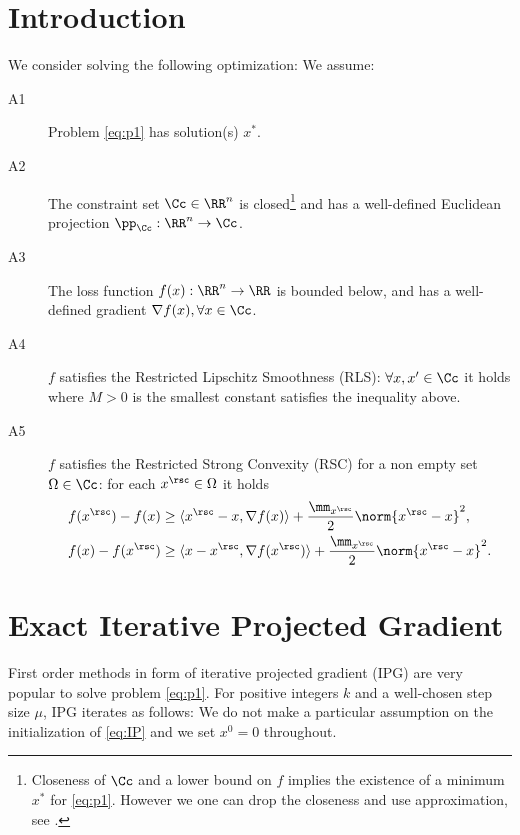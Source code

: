\section{Introduction}
We consider solving the following optimization:
We assume:
\begin{description}
\item [A1] Problem \eqref{eq:p1} has solution(s) $x^*$.	
\item [A2]The constraint set $\Cc\in \RR^n$ is closed\footnote{Closeness of $\Cc$ and a lower bound on $f$ implies the existence of a minimum $x^*$ for \eqref{eq:p1}. However we one can drop the closeness and use approximation, see \cite{Blumen}.} and has a well-defined Euclidean projection $\pp_\Cc:\RR^n\rightarrow \Cc$. %
\item [A3] The loss function $f(x):\RR^n\rightarrow \RR$ is bounded below, and has a well-defined gradient $\nabla f(x), \forall x\in \Cc$.
\item [A4] $f$ satisfies the Restricted Lipschitz Smoothness (RLS): $\forall x,x'\in \Cc$ it holds 
where $M>0$ is the smallest constant satisfies the inequality above.
\item [A5]  $f$ satisfies the Restricted Strong Convexity (RSC) for a non empty set $\Omega\in \Cc$: for each $x^\rsc\in\Omega$ it holds
\begin{align*} 
f(x^\rsc)-f(x) &\geq \langle x^\rsc -x,\nabla f(x)\rangle + \frac{\mm_{x^\rsc}}{2} \norm{x^\rsc-x}^2,\\
f(x)- f(x^\rsc) &\geq \langle x-x^\rsc,\nabla f(x^\rsc)\rangle + \frac{\mm_{x^\rsc}}{2} \norm{x^\rsc-x}^2.
\end{align*}
\end{description}





\section{Exact Iterative Projected Gradient}
First order methods in form of iterative projected gradient (IPG) are very popular to solve problem \eqref{eq:p1}. For positive integers $k$ and a well-chosen step size $\mu$, IPG iterates as follows:
We do not make a particular assumption on the initialization of \eqref{eq:IP} and we set $x^0=0$ throughout.

